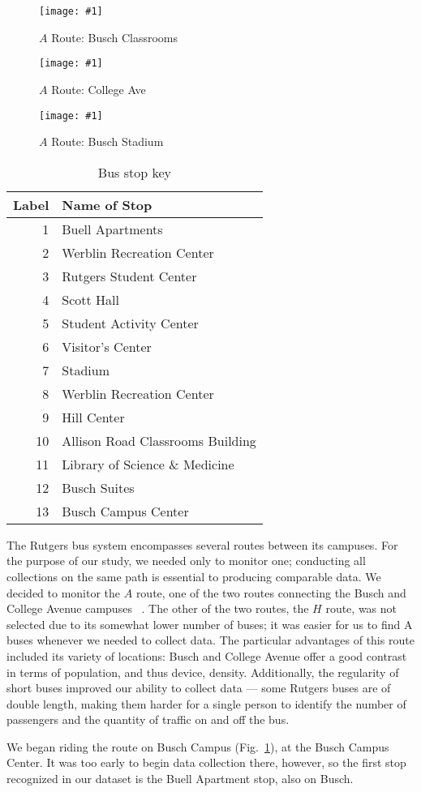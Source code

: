 \documentclass[12pt,journal,compsoc]{IEEEtran} %
\newcommand{\minipic}[3]{
  \begin{figure}[!t]
    \centering
    \texttt{[image: \#1]}
    \caption{#2}
    \label{#3}
  \end{figure}
}
\begin{document}
\minipic{aroutebusch}{$A$ Route: Busch Classrooms} {fig:aroutebusch}
\minipic{aroutecollegeave}{$A$ Route: College Ave}{fig:aroutecollegeave}
\minipic{aroutestadium}{$A$ Route: Busch Stadium}{fig:aroutestadium}

\begin{table}[!t]
  \centering
  \caption{Bus stop key}
  \begin{tabular}{ rl }
    \toprule
    Label & Name of Stop\\
    \midrule
    1 & Buell Apartments\\
    2 & Werblin Recreation Center\\
    3 & Rutgers Student Center\\
    4 & Scott Hall\\
    5 & Student Activity Center\\
    6 & Visitor's Center\\
    7 & Stadium\\
    8 & Werblin Recreation Center\\
    9 & Hill Center\\
    10 & Allison Road Classrooms Building\\
    11 & Library of Science \& Medicine\\
    12 & Busch Suites\\
    13 & Busch Campus Center\\
    \bottomrule
  \end{tabular}
  \label{tab:stops}
\end{table}

The Rutgers bus system encompasses several routes between its campuses.
For the purpose of our study, we needed only to monitor one; conducting all collections on the same path is essential to producing comparable data.
We decided to monitor the $A$ route, one of the two routes connecting the Busch and College Avenue campuses ~\cite{busroutes}.
The other of the two routes, the $H$ route, was not selected due to its somewhat lower number of buses; it was easier for us to find A buses whenever we needed to collect data.
The particular advantages of this route included its variety of locations: Busch and College Avenue offer a good contrast in terms of population, and thus device, density.
Additionally, the regularity of short buses improved our ability to collect data --- some Rutgers buses are of double length, making them harder for a single person to identify the number of passengers and the quantity of traffic on and off the bus.

We began riding the route on Busch Campus (Fig.~\ref{fig:aroutebusch}), at the Busch Campus Center.
It was too early to begin data collection there, however, so the first stop recognized in our dataset is the Buell Apartment stop, also on Busch.
\end{document}
